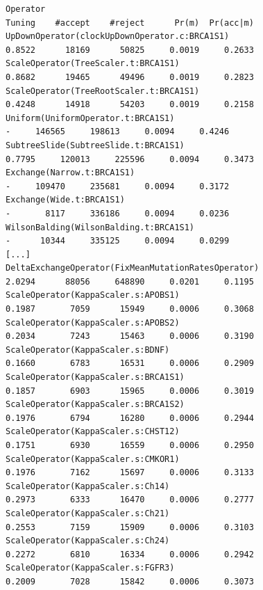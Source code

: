 \documentclass[12pt]{article}
\begin{document}
\begin{verbatim}Operator                                                                Tuning    #accept    #reject      Pr(m)  Pr(acc|m)
UpDownOperator(clockUpDownOperator.c:BRCA1S1)                           0.8522      18169      50825     0.0019     0.2633 
ScaleOperator(TreeScaler.t:BRCA1S1)                                     0.8682      19465      49496     0.0019     0.2823 
ScaleOperator(TreeRootScaler.t:BRCA1S1)                                 0.4248      14918      54203     0.0019     0.2158 
Uniform(UniformOperator.t:BRCA1S1)                                           -     146565     198613     0.0094     0.4246 
SubtreeSlide(SubtreeSlide.t:BRCA1S1)                                    0.7795     120013     225596     0.0094     0.3473 
Exchange(Narrow.t:BRCA1S1)                                                   -     109470     235681     0.0094     0.3172 
Exchange(Wide.t:BRCA1S1)                                                     -       8117     336186     0.0094     0.0236 
WilsonBalding(WilsonBalding.t:BRCA1S1)                                       -      10344     335125     0.0094     0.0299 
[...]
DeltaExchangeOperator(FixMeanMutationRatesOperator)                     2.0294      88056     648890     0.0201     0.1195 
ScaleOperator(KappaScaler.s:APOBS1)                                     0.1987       7059      15949     0.0006     0.3068 
ScaleOperator(KappaScaler.s:APOBS2)                                     0.2034       7243      15463     0.0006     0.3190 
ScaleOperator(KappaScaler.s:BDNF)                                       0.1660       6783      16531     0.0006     0.2909 
ScaleOperator(KappaScaler.s:BRCA1S1)                                    0.1857       6903      15965     0.0006     0.3019 
ScaleOperator(KappaScaler.s:BRCA1S2)                                    0.1976       6794      16280     0.0006     0.2944 
ScaleOperator(KappaScaler.s:CHST12)                                     0.1751       6930      16559     0.0006     0.2950 
ScaleOperator(KappaScaler.s:CMKOR1)                                     0.1976       7162      15697     0.0006     0.3133 
ScaleOperator(KappaScaler.s:Ch14)                                       0.2973       6333      16470     0.0006     0.2777 
ScaleOperator(KappaScaler.s:Ch21)                                       0.2553       7159      15909     0.0006     0.3103 
ScaleOperator(KappaScaler.s:Ch24)                                       0.2272       6810      16334     0.0006     0.2942 
ScaleOperator(KappaScaler.s:FGFR3)                                      0.2009       7028      15842     0.0006     0.3073 

\end{verbatim}
\end{document}
